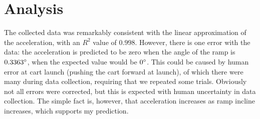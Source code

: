 \documentclass{article}
\begin{document}
    \section{Analysis}
        The collected data was remarkably consistent with the linear approximation
        of the acceleration, with an \(R^{2}\) value of \(0.998\). However, there
        is one error with the data: the acceleration is predicted to be zero when
        the angle of the ramp is \(0.3363\degree\), when the expected value would
        be \(0\degree\). This could be caused by human error at cart launch (pushing
        the cart forward at launch), of which there were many during data collection,
        requiring that we repeated some trials. Obviously not all errors were
        corrected, but this is expected with human uncertainty in data collection.
        The simple fact is, however, that acceleration increases as ramp incline
        increases, which supports my prediction.
\end{document}
